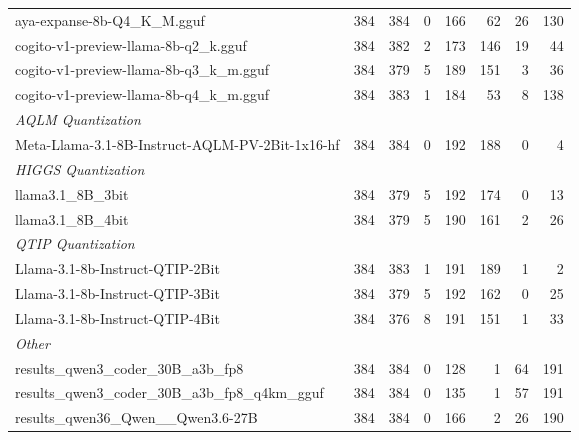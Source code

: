 \begin{table}[htbp]
{\begin{tabular}{lrrrrrrr}
    aya-expanse-8b-Q4\_K\_M.gguf & 384 & 384 & 0 & 166 & 62 & 26 & 130 \\
    cogito-v1-preview-llama-8b-q2\_k.gguf & 384 & 382 & 2 & 173 & 146 & 19 & 44 \\
    cogito-v1-preview-llama-8b-q3\_k\_m.gguf & 384 & 379 & 5 & 189 & 151 & 3 & 36 \\
    cogito-v1-preview-llama-8b-q4\_k\_m.gguf & 384 & 383 & 1 & 184 & 53 & 8 & 138 \\
    \midrule
    \multicolumn{8}{l}{\textit{AQLM Quantization}} \\
    \midrule
    Meta-Llama-3.1-8B-Instruct-AQLM-PV-2Bit-1x16-hf & 384 & 384 & 0 & 192 & 188 & 0 & 4 \\
    \midrule
    \multicolumn{8}{l}{\textit{HIGGS Quantization}} \\
    \midrule
    llama3.1\_8B\_3bit & 384 & 379 & 5 & 192 & 174 & 0 & 13 \\
    llama3.1\_8B\_4bit & 384 & 379 & 5 & 190 & 161 & 2 & 26 \\
    \midrule
    \multicolumn{8}{l}{\textit{QTIP Quantization}} \\
    \midrule
    Llama-3.1-8b-Instruct-QTIP-2Bit & 384 & 383 & 1 & 191 & 189 & 1 & 2 \\
    Llama-3.1-8b-Instruct-QTIP-3Bit & 384 & 379 & 5 & 192 & 162 & 0 & 25 \\
    Llama-3.1-8b-Instruct-QTIP-4Bit & 384 & 376 & 8 & 191 & 151 & 1 & 33 \\
    \midrule
    \multicolumn{8}{l}{\textit{Other}} \\
    \midrule
    results\_qwen3\_coder\_30B\_a3b\_fp8 & 384 & 384 & 0 & 128 & 1 & 64 & 191 \\
    results\_qwen3\_coder\_30B\_a3b\_fp8\_q4km\_gguf & 384 & 384 & 0 & 135 & 1 & 57 & 191 \\
    results\_qwen36\_Qwen\_\_Qwen3.6-27B & 384 & 384 & 0 & 166 & 2 & 26 & 190 \\
    \bottomrule
  \end{tabular}
  }
\end{table}

